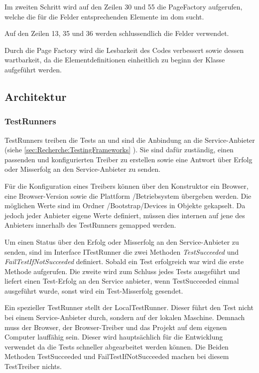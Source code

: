 Im zweiten Schritt wird auf den Zeilen 30 und 55 die PageFactory aufgerufen, welche die für die Felder entsprechenden Elemente im \gls{dom} sucht.

Auf den Zeilen 13, 35 und 36 werden schlussendlich die Felder verwendet.

Durch die Page Factory wird die Lesbarkeit des Codes verbessert sowie dessen wartbarkeit, da die Elementdefinitionen einheitlich zu beginn der Klasse aufgeführt werden.

\subsection{Architektur}
\subsubsection{TestRunners}
\label{sec:umsetzung:implementierung:architektur:testrunners}
TestRunners treiben die Tests an und sind die Anbindung an die Service-Anbieter (siehe \cref{sec:Recherche:TestingFrameworks} ). Sie sind dafür zuständig, einen passenden und konfigurierten Treiber zu erstellen sowie eine Antwort über Erfolg oder Misserfolg an den Service-Anbieter zu senden.

Für die Konfiguration eines Treibers können über den Konstruktor ein Browser, eine Browser-Version sowie die Plattform /Betriebsystem übergeben werden. Die möglichen Werte sind im Ordner /Bootstrap/Devices in Objekte gekapselt. Da jedoch jeder Anbieter eigene Werte definiert, müssen dies internen auf jene des Anbieters innerhalb des TestRunners gemapped werden.

Um einen Status über den Erfolg oder Misserfolg an den Service-Anbieter zu senden, sind im Interface ITestRunner die zwei Methoden \textit{TestSucceeded} und \textit{FailTestIfNotSucceeded} definiert. Sobald ein Test erfolgreich war wird die erste Methode aufgerufen. Die zweite wird zum Schluss jedes Tests ausgeführt und liefert einen Test-Erfolg an den Service anbieter, wenn TestSucceeded einmal ausgeführt wurde, sonst wird ein Test-Misserfolg gesendet.

Ein spezieller TestRunner stellt der LocalTestRunner. Dieser führt den Test nicht bei einem Service-Anbieter durch, sondern auf der lokalen Maschine. Demnach muss der Browser, der Browser-Treiber und das Projekt auf dem eigenen Computer lauffähig sein. Dieser wird hauptsächlich für die Entwicklung verwendet da die Tests schneller abgearbeitet werden können. Die Beiden Methoden TestSucceeded und FailTestIfNotSucceeded machen bei diesem TestTreiber nichts.

